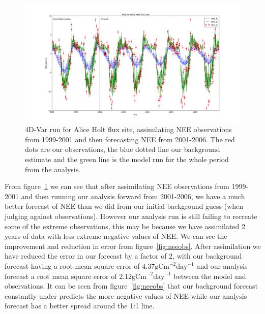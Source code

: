 \documentclass[11pt]{article}
\begin{document}
\begin{figure}[!h]
    \centering
    \includegraphics[width=.9\textwidth]{ah_assim_edinpvals.png}
    \caption{4D-Var run for Alice Holt flux site, assimilating NEE observations from 1999-2001 and then forecasting NEE from 2001-2006. The red dots are our observations, the blue dotted line our background estimate and the green line is the model run for the whole period from the analysis.}
    \label{fig:4dvar}
\end{figure}

From figure~\ref{fig:4dvar} we can see that after assimilating NEE observations from 1999-2001 and then running our analysis forward from 2001-2006, we have a much better forecast of NEE than we did from our initial background guess (when judging against observations). However our analysis run is still failing to recreate some of the extreme observations, this may be because we have assimilated 2 years of data with less extreme negative values of NEE. We can see the improvement and reduction in error from figure~\ref{fig:neeobs}. After assimilation we have reduced the error in our forecast by a factor of 2, with our background forecast having a root mean square error of $4.37 \text{gCm}^{-2}\text{day}^{-1}$ and our analysis forecast a root mean square error of $2.12 \text{gCm}^{-2}\text{day}^{-1}$ between the model and observations. It can be seen from figure~\ref{fig:neeobs} that our background forecast constantly under predicts the more negative values of NEE while our analysis forecast has a better spread around the 1:1 line.
\end{document}
